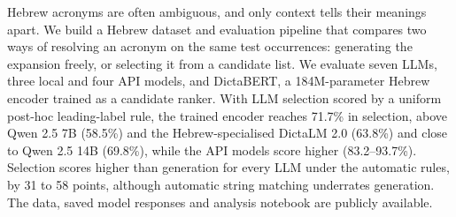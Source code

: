 Hebrew acronyms are often ambiguous, and only context tells their meanings apart. We build a Hebrew dataset and evaluation pipeline that compares two ways of resolving an acronym on the same test occurrences: generating the expansion freely, or selecting it from a candidate list. We evaluate seven LLMs, three local and four API models, and DictaBERT, a 184M-parameter Hebrew encoder trained as a candidate ranker. With LLM selection scored by a uniform post-hoc leading-label rule, the trained encoder reaches 71.7\% in selection, above Qwen 2.5 7B (58.5\%) and the Hebrew-specialised DictaLM 2.0 (63.8\%) and close to Qwen 2.5 14B (69.8\%), while the API models score higher (83.2--93.7\%). Selection scores higher than generation for every LLM under the automatic rules, by 31 to 58 points, although automatic string matching underrates generation. The data, saved model responses and analysis notebook are publicly available.
